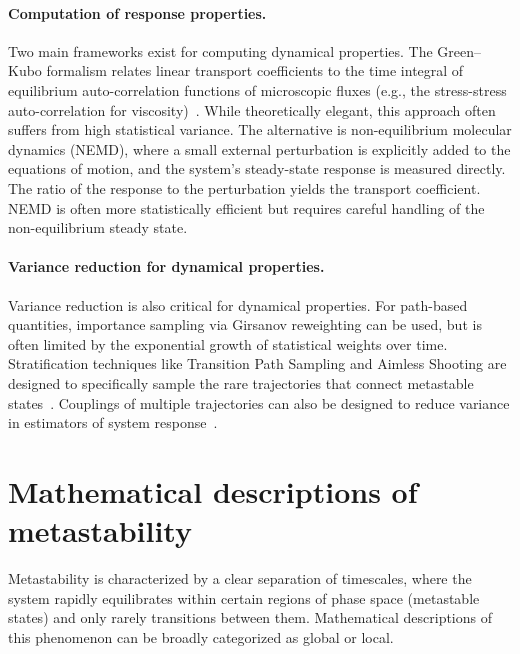 \paragraph{Computation of response properties.} Two main frameworks exist for computing dynamical properties. The Green--Kubo formalism relates linear transport coefficients to the time integral of equilibrium auto-correlation functions of microscopic fluxes (e.g., the stress-stress auto-correlation for viscosity)~\cite{BLS25a}. While theoretically elegant, this approach often suffers from high statistical variance. The alternative is non-equilibrium molecular dynamics (NEMD), where a small external perturbation is explicitly added to the equations of motion, and the system's steady-state response is measured directly. The ratio of the response to the perturbation yields the transport coefficient. NEMD is often more statistically efficient but requires careful handling of the non-equilibrium steady state.

\paragraph{Variance reduction for dynamical properties.} Variance reduction is also critical for dynamical properties. For path-based quantities, importance sampling via Girsanov reweighting can be used, but is often limited by the exponential growth of statistical weights over time. Stratification techniques like Transition Path Sampling and Aimless Shooting are designed to specifically sample the rare trajectories that connect metastable states~\cite{BLS25a}. Couplings of multiple trajectories can also be designed to reduce variance in estimators of system response~\cite{BLS25a}.

\section{Mathematical descriptions of metastability}
\label{sec:01:metastability}
Metastability is characterized by a clear separation of timescales, where the system rapidly equilibrates within certain regions of phase space (metastable states) and only rarely transitions between them. Mathematical descriptions of this phenomenon can be broadly categorized as global or local.

